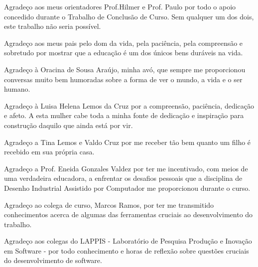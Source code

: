 \begin{agradecimentos}
Agradeço aos meus orientadores Prof.Hilmer e Prof. Paulo por todo o apoio 
concedido durante o Trabalho de Conclusão de Curso. Sem qualquer um dos dois, 
este trabalho não seria possível.

Agradeço aos meus pais pelo dom da vida, pela paciência, pela compreensão e 
sobretudo por mostrar que a educação é um dos únicos bens duráveis na vida.

Agradeço à Oracina de Sousa Araújo, minha avó, que sempre me proporcionou 
conversas muito bem humoradas sobre a forma de ver o mundo, a vida e o ser 
humano.

Agradeço à Luisa Helena Lemos da Cruz por a compreensão, paciência, dedicação e
afeto. A esta mulher cabe toda a minha fonte de dedicação e inspiração para 
construção daquilo que ainda está por vir.

Agradeço a Tina Lemos e Valdo Cruz por me receber tão bem quanto um filho é 
recebido em sua própria casa.

Agradeço a Prof. Eneida Gonzales Valdez por ter me incentivado, com meios de uma
verdadeira educadora, a enfrentar os desafios pessoais que a disciplina de 
Desenho Industrial Assistido por Computador me proporcionou durante o curso.

Agradeço ao colega de curso, Marcos Ramos, por ter me transmitido conhecimentos 
acerca de algumas das ferramentas cruciais ao desenvolvimento do trabalho.

Agradeço aos colegas do LAPPIS - Laboratório de Pesquisa Produção e Inovação em 
Software - por todo conhecimento e horas de reflexão sobre questões cruciais do
desenvolvimento de software.

\end{agradecimentos}
